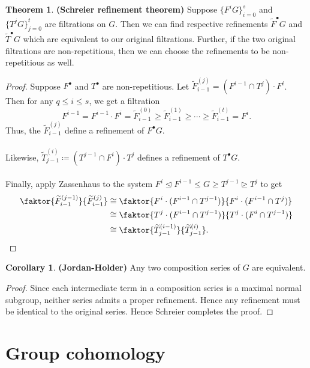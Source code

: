 \documentclass[10pt,letterpaper,cm]{nupset}
\theoremstyle{definition}
\newtheorem{theorem}{Theorem}
\newtheorem{corollary}{Corollary}
\newcommand{\1}{\mathbf{1}}
\newcommand{\0}{\vec 0}
\begin{document}
\begin{theorem}{\textbf{(Schreier refinement theorem)}}
Suppose $\{F^iG\}_{i=0}^s$ and $\{T^jG\}_{j=0}^t$ are filtrations on $G$. Then we can find respective refinements $\widetilde{F}^{\bullet}G$ and $\widetilde{T}^{\bullet}G$ which are equivalent to our original filtrations. Further, if the two original filtrations are non-repetitious, then we can choose the refinements to be non-repetitious as well. 
\end{theorem}
\begin{proof}
Suppose $F^{\bullet}$ and $T^{\bullet}$ are non-repetitious. Let $\widetilde{F}_{i-1}^{(j)} =  (F^{i-1}\cap T^j) \cdot F^i$. Then for any $q\leq i \leq s$, we get a filtration $$F^{i-1} = F^{i-1}\cdot F^i =\widetilde{F}_{i-1}^{(0)}\geq \widetilde{F}_{i-1}^{(1)}\geq \cdots \geq \widetilde{F}_{i-1}^{(t)} = F^i.$$ Thus, the $\widetilde{F}_{i-1}^{(j)}$ define a refinement of $F^{\bullet}G$. 
\\ \\ Likewise, $\widetilde{T}_{j-1}^{(i)} \coloneqq  (T^{j-1}\cap F^i) \cdot T^j$ defines a refinement of $T^{\bullet}G$.
\\ \\ Finally, apply Zassenhaus to the system $F^i \unlhd F^{i-1} \leq G \geq T^{j-1} \unrhd T^j$ to get
\begin{align*}
\faktor{\widetilde{F}_{i-1}^{(j-1)}}{\widetilde{F}_{i-1}^{(j)}} & \cong \faktor{F^i\cdot (F^{i-1} \cap T^{j-1})}{F^i \cdot (F^{i-1} \cap T^j)}
\\ &  \cong \faktor{T^j \cdot (F^{i-1} \cap T^{j-1})}{T^j\cdot (F^i \cap T^{j-1})}
\\ &  \cong   \faktor{\widetilde{T}_{j-1}^{(i-1)}}{\widetilde{T}_{j-1}^{(i)}} .
\end{align*}
\end{proof}

\begin{corollary}{\textbf{(Jordan-Holder)}}
Any two composition series of $G$ are equivalent.
\end{corollary}
\begin{proof}
Since each intermediate term in a composition series is a maximal normal subgroup, neither series admits a proper refinement. Hence any refinement must be identical to the original series. Hence Schreier completes the proof.
\end{proof}

\section{Group cohomology}
\end{document}
